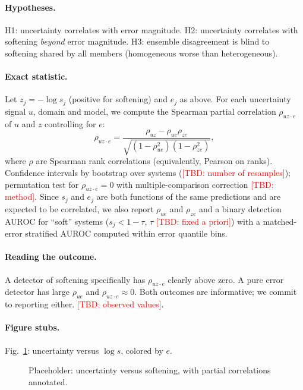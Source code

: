 \documentclass{article}
\newcommand{\TBD}[1]{\textcolor{red}{[TBD: #1]}}
\newcommand{\sfs}{s}      %
\begin{document}
\paragraph{Hypotheses.} H1: uncertainty correlates with error magnitude. H2: uncertainty correlates with softening \emph{beyond} error magnitude. H3: ensemble disagreement is blind to softening shared by all members (homogeneous worse than heterogeneous).

\paragraph{Exact statistic.} Let $z_j=-\log \sfs_j$ (positive for softening) and $e_j$ as above. For each uncertainty signal $u$, domain and model, we compute the Spearman partial correlation $\rho_{uz\cdot e}$ of $u$ and $z$ controlling for $e$:
\begin{equation}
\rho_{uz\cdot e}=\frac{\rho_{uz}-\rho_{ue}\rho_{ze}}{\sqrt{(1-\rho_{ue}^2)(1-\rho_{ze}^2)}},
\end{equation}
where $\rho$ are Spearman rank correlations (equivalently, Pearson on ranks). Confidence intervals by bootstrap over systems (\TBD{number of resamples}); permutation test for $\rho_{uz\cdot e}=0$ with multiple-comparison correction \TBD{method}. Since $\sfs_j$ and $e_j$ are both functions of the same predictions and are expected to be correlated, we also report $\rho_{ue}$ and $\rho_{ze}$ and a binary detection AUROC for ``soft'' systems ($\sfs_j<1-\tau$, $\tau$ \TBD{fixed a priori}) with a matched-error stratified AUROC computed within error quantile bins.

\paragraph{Reading the outcome.} A detector of softening specifically has $\rho_{uz\cdot e}$ clearly above zero. A pure error detector has large $\rho_{ue}$ and $\rho_{uz\cdot e}\approx 0$. Both outcomes are informative; we commit to reporting either. \TBD{observed values}.

\paragraph{Figure stubs.} Fig.~\ref{fig:unc}: uncertainty versus $\log \sfs$, colored by $e$.
\begin{figure}[h]
\centering
\fbox{\parbox{0.8\linewidth}{\centering\vspace{2em}\TBD{scatter of $u$ versus $-\log\sfs$ per domain; panels for ensemble and latent}\vspace{2em}}}
\caption{Placeholder: uncertainty versus softening, with partial correlations annotated.}\label{fig:unc}
\end{figure}
\end{document}
